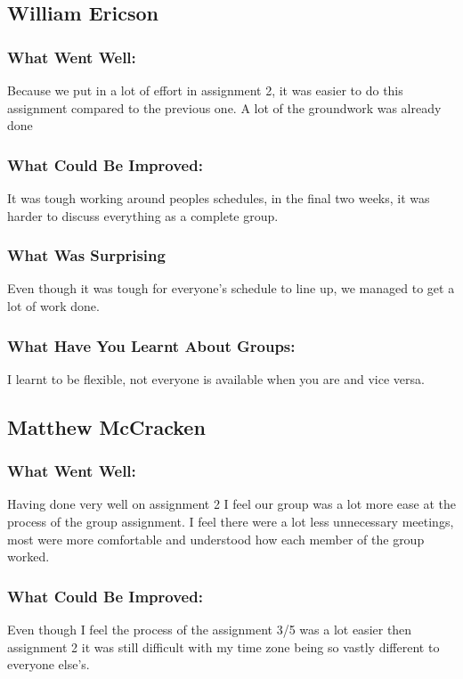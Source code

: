 \documentclass[11pt, oneside, a4paper, titlepage]{article}
\begin{document}
\subsection{William Ericson}
\subsubsection{What Went Well:}
Because we put in a lot of effort in assignment 2, it was easier to do this assignment compared to the previous one. A lot of the groundwork was already done 

\subsubsection{What Could Be Improved:}
It was tough working around peoples schedules, in the final two weeks, it was harder to discuss everything as a complete group. 

\subsubsection{What Was Surprising}
Even though it was tough for everyone's schedule to line up, we managed to get a lot of work done. 

\subsubsection{What Have You Learnt About Groups:}
I learnt to be flexible, not everyone is available when you are and vice versa. 

\subsection{Matthew McCracken}
\subsubsection{What Went Well:}
Having done very well on assignment 2 I feel our group was a lot more ease at the process of the group assignment. I feel there were a lot less unnecessary meetings, most were more comfortable and understood how each member of the group worked. 

\subsubsection{What Could Be Improved:}
Even though I feel the process of the assignment 3/5 was a lot easier then assignment 2 it was still difficult with my time zone being so vastly different to everyone else’s.
\end{document}
